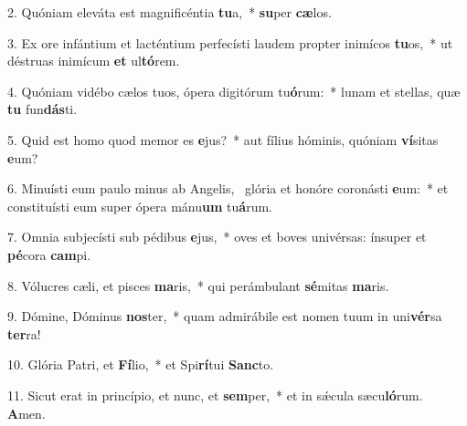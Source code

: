 2. Quóniam eleváta est magnificéntia \textbf{tu}a,~*  \textbf{su}per \textbf{cæ}los.\

3. Ex ore infántium et lacténtium perfecísti laudem propter inimícos \textbf{tu}os,~*  ut déstruas inimícum \textbf{et} ul\textbf{tó}rem.\

4. Quóniam vidébo cælos tuos, ópera digitórum tu\textbf{ó}rum:~*  lunam et stellas, quæ \textbf{tu} fun\textbf{dás}ti.\

5. Quid est homo quod memor es \textbf{e}jus?~*  aut fílius hóminis, quóniam \textbf{ví}sitas \textbf{e}um?\

6. Minuísti eum paulo minus ab Angelis, \dag\  glória et honóre coronásti \textbf{e}um:~*  et constituísti eum super ópera mánu\textbf{um} tu\textbf{á}rum.\

7. Omnia subjecísti sub pédibus \textbf{e}jus,~*  oves et boves univérsas: ínsuper et \textbf{pé}cora \textbf{cam}pi.\

8. Vólucres cæli, et pisces \textbf{ma}ris,~*  qui perámbulant \textbf{sé}mitas \textbf{ma}ris.\

9. Dómine, Dóminus \textbf{nos}ter,~*  quam admirábile est nomen tuum in uni\textbf{vér}sa \textbf{ter}ra!\

10. Glória Patri, et \textbf{Fí}lio,~*  et Spi\textbf{rí}tui \textbf{Sanc}to.\

11. Sicut erat in princípio, et nunc, et \textbf{sem}per,~*  et in sǽcula sæcu\textbf{ló}rum. \textbf{A}men.\

